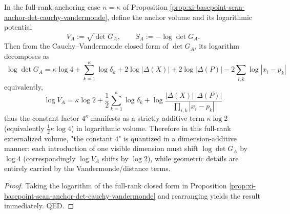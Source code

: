
\begin{corollary}\label{cor:xi-anchor-gram-log4-quantum}
In the full-rank anchoring case \(n=\kappa\) of Proposition \ref{prop:xi-basepoint-scan-anchor-det-cauchy-vandermonde}, define the anchor volume and its logarithmic potential
\[
V_A:=\sqrt{\det G_A},\qquad S_A:=-\log\det G_A.
\]
Then from the Cauchy--Vandermonde closed form of \(\det G_A\), its logarithm decomposes as
\[
\boxed{\;
\log\det G_A
=\kappa\log 4+\sum_{k=1}^{\kappa}\log\delta_k
+2\log|\Delta(X)|+2\log|\Delta(P)|
-2\sum_{i,k}\log|x_i-p_k|\;}
\]
equivalently,
\[
\boxed{\;
\log V_A
=\kappa\log 2+\frac12\sum_{k=1}^{\kappa}\log\delta_k
+\log\frac{|\Delta(X)|\,|\Delta(P)|}{\prod_{i,k}|x_i-p_k|}\;}
\]
thus the constant factor \(4^\kappa\) manifests as a strictly additive term \(\kappa\log 2\) (equivalently \(\tfrac12\kappa\log 4\)) in logarithmic volume.
Therefore in this full-rank externalized volume, "the constant \(4\)" is quantized in a dimension-additive manner: each introduction of one visible dimension must shift \(\log\det G_A\) by \(\log 4\) (correspondingly \(\log V_A\) shifts by \(\log 2\)), while geometric details are entirely carried by the Vandermonde/distance terms.
\end{corollary}
\begin{proof}
Taking the logarithm of the full-rank closed form in Proposition \ref{prop:xi-basepoint-scan-anchor-det-cauchy-vandermonde} and rearranging yields the result immediately. QED.
\end{proof}

